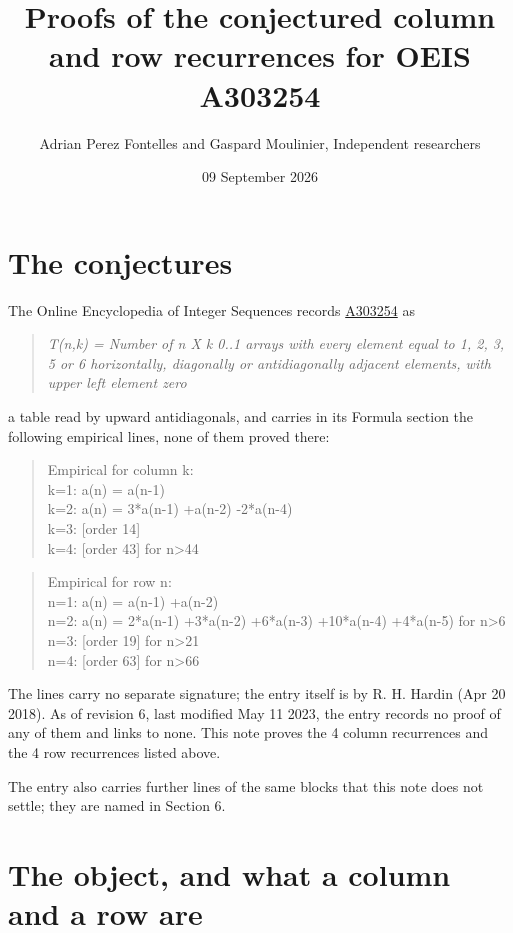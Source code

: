 \documentclass[11pt]{article}
\title{Proofs of the conjectured column and row recurrences for OEIS A303254}
\author{Adrian Perez Fontelles and Gaspard Moulinier, Independent researchers}
\date{09 September 2026}
\theoremstyle{definition}
\begin{document}
\maketitle
\section{The conjectures}

The Online Encyclopedia of Integer Sequences records \href{https://oeis.org/A303254}{A303254} as

\begin{quote}\itshape T(n,k) = Number of n X k 0..1 arrays with every element equal to 1, 2, 3, 5 or 6 horizontally, diagonally or antidiagonally adjacent elements, with upper left element zero\end{quote}

a table read by upward antidiagonals, and carries in its Formula section the following empirical lines, none of them proved there:

\begin{quote}\ttfamily Empirical for column k:\\
k=1: a(n) = a(n-1)\\k=2: a(n) = 3*a(n-1) +a(n-2) -2*a(n-4)\\k=3: [order 14]\\k=4: [order 43] for n>44\end{quote}

\begin{quote}\ttfamily Empirical for row n:\\
n=1: a(n) = a(n-1) +a(n-2)\\n=2: a(n) = 2*a(n-1) +3*a(n-2) +6*a(n-3) +10*a(n-4) +4*a(n-5) for n>6\\n=3: [order 19] for n>21\\n=4: [order 63] for n>66\end{quote}

The lines carry no separate signature; the entry itself is by R. H. Hardin (Apr 20 2018). As of revision 6, last modified May 11 2023, the entry records no proof of any of them and links to none. This note proves the 4 column recurrences and the 4 row recurrences listed above.

The entry also carries further lines of the same blocks that this note does not settle; they are named in Section 6.

\section{The object, and what a column and a row are}
\end{document}
